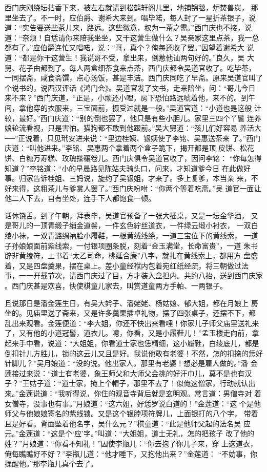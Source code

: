西门庆刚绕坛拈香下来，被左右就请到松鹤轩阁儿里，地铺锦毯，炉焚兽炭，
那里坐去了。不一时，应伯爵、谢希大来到。唱毕喏，每人封了一星折茶银子，说
道：“实告要送些茶儿来，路远。这些微意，权为一茶之需。”西门庆也不接，说
道：“奈烦！自恁请你来陪我坐坐，又干这营生做什么？吴亲家这里点茶，我一总
都有了。”应伯爵连忙又唱喏，说：“哥，真个？俺每还收了罢。”因望着谢希大
说道：“都是你干这营生！我说哥不受，拿出来，倒惹他讪两句好的。”良久，吴
大舅、花子由都到了。每人两盒细茶食来点茶，西门庆都令吴道官收了。吃毕茶，
一同摆斋，咸食斋馔，点心汤饭，甚是丰洁。西门庆同吃了早斋。原来吴道官叫了
个说书的，说西汉评话《鸿门会》。吴道官发了文书，走来陪坐，问：“哥儿今日
来不来？”西门庆道，“正是，小顽还小哩，房下恐怕路远唬着他，来不的。到午
间，拿他穿的衣服来，三宝面前，摄受过就是一般。”吴道官道：“小道也是这般
计较，最好。”西门庆道：“别的倒也罢了，他只是有些小胆儿。家里三四个丫鬟
连养娘轮流看视，只是害怕。猫狗都不敢到他跟前。”吴大舅道：“孩儿们好容易
养活大──”正说着，只见玳安进来说：“里边桂姨、银姨使了李铭、吴惠送茶来
了。”西门庆道：“叫他进来。”李铭、吴惠两个拿着两个盒子跪下，揭开都是顶
皮饼、松花饼、白糖万寿糕、玫瑰搽穰卷儿。西门庆俱令吴道官收了，因问李铭：
“你每怎得知道？”李铭道：“小的早晨路见陈姑夫骑头口，问来，才知道爹今日
在此做好事。归家告诉桂姐、三妈说，旋约了吴银姐，才来了。多上复爹，本当亲
来，不好来得，这粗茶儿与爹赏人罢了。”西门庆吩咐：“你两个等着吃斋。”吴
道官一面让他二人下去，自有坐处，连手下人都饱食一顿。

话休饶舌。到了午朝，拜表毕，吴道官预备了一张大插桌，又是一坛金华酒，
又是哥儿的一顶青缎子绡金道髻，一件玄色紵丝道衣，一件绿云缎小衬衣，
一双白绫小袜，一双青潞绸衲脸小履鞋，一根黄绒线绦，一道三宝位下的黄线索，
一道子孙娘娘面前紫线索，一付银项圈条脱，刻着“金玉满堂，长命富贵”，一道
朱书辟非黄绫符，上书着“太乙司命，桃延合康”八字，就扎在黄线索上，都用方
盘盛着，又是四盘羹果，摆在桌上。差小童经袱内包着宛红纸经疏，将三朝做过法
事，一一开载节次，请西门庆过了目，方才装入盒担内。共约八抬，送到西门庆家
。西门庆甚是欢喜，快使棋童儿家去，叫赏道童两方手帕、一两银子。

且说那日是潘金莲生日，有吴大妗子、潘姥姥、杨姑娘、郁大姐，都在月娘上
房坐的。见庙里送了斋来，又是许多羹果插卓礼物，摆了四张桌子，还摆不下，都
乱出来观看。金莲便道：“李大姐，你还不快出来看哩！你家儿子师父庙里送礼来
了，又有他的小道冠髻，道衣儿。噫，你看，又是小履鞋儿！”孟玉楼走向前，拿
起来手中看，说道：“大姐姐，你看道士家也恁精细，这小履鞋，白绫底儿，都是
倒扣针儿方胜儿，锁的这云儿又且是好。我说他敢有老婆！不然，怎的扣捺的恁好
针脚儿？”吴月娘道：“没的说。他出家人，那里有老婆！想必是雇人做的。”潘
金莲接过来说：“道士有老婆，象王师父和大师父会挑的好汗巾儿，莫不是也有汉
子？”王姑子道：“道士家，掩上个帽子，那里不去了！似俺这僧家，行动就认出
来。”金莲说道：“我听得说，你住的观音寺背后就是玄明观。常言道：男僧寺对
着女僧寺，没事也有事。”月娘道：“这六姐，好恁罗说白道的！”金莲道：“这
个是他师父与他娘娘寄名的紫线锁。又是这个银脖项符牌儿，上面银打的八个字，
带着且是好看。背面坠着他名字，吴什么元？”棋童道：“此是他师父起的法名吴
应元。”金莲道：“这是个‘应’字。”叫道：“大姐姐，道士无礼，怎的把孩子
改了他的姓？”月娘道：“你看不知礼！”因使李瓶儿：“你去抱了你儿子来，穿
上这道衣，俺每瞧瞧好不好？”李瓶儿道：“他才睡下，又抱他出来？”金莲道：
“不妨事，你揉醒他。”那李瓶儿真个去了。

